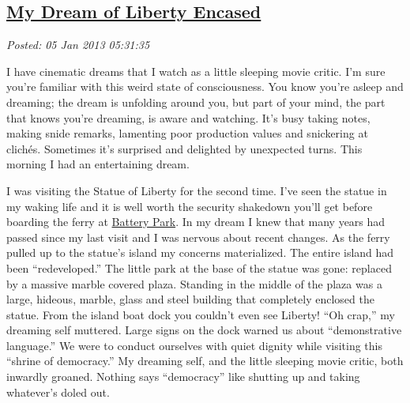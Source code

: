 %

\subsection*{\href{https://bakerjd99.wordpress.com/2013/01/04/my-dream-of-liberty-encased/}{My Dream of Liberty Encased}}


\noindent\emph{Posted: 05 Jan 2013 05:31:35}
\vspace{6pt}

I have cinematic dreams that I watch as a little sleeping movie critic.
I'm sure you're familiar with this weird state of consciousness. You
know you're asleep and dreaming; the dream is unfolding around you, but
part of your mind, the part that knows you're dreaming, is aware and
watching. It's busy taking notes, making snide remarks, lamenting poor
production values and snickering at clichés. Sometimes it's surprised
and delighted by unexpected turns. This morning I had an entertaining
dream.

 
I was visiting the Statue of Liberty for the second time. I've seen the
statue in my waking life and it is well worth the security shakedown
you'll get before boarding the ferry at
\href{http://www.statuecruises.com/pd\_directions.html}{Battery Park}.
In my dream I knew that many years had passed since my last visit and I
was nervous about recent changes. As the ferry pulled up to the statue's
island my concerns materialized. The entire island had been
``redeveloped.'' The little park at the base of the statue was gone:
replaced by a massive marble covered plaza. Standing in the middle of
the plaza was a large, hideous, marble, glass and steel building that
completely enclosed the statue. From the island boat dock
you couldn't even see Liberty! ``Oh crap,'' my dreaming self muttered.
Large signs on the dock warned us about ``demonstrative language.'' We
were to conduct ourselves with quiet dignity while visiting this
``shrine of democracy.'' My dreaming self, and the little sleeping movie
critic, both inwardly groaned. Nothing says ``democracy'' like shutting
up and taking whatever's doled out.

